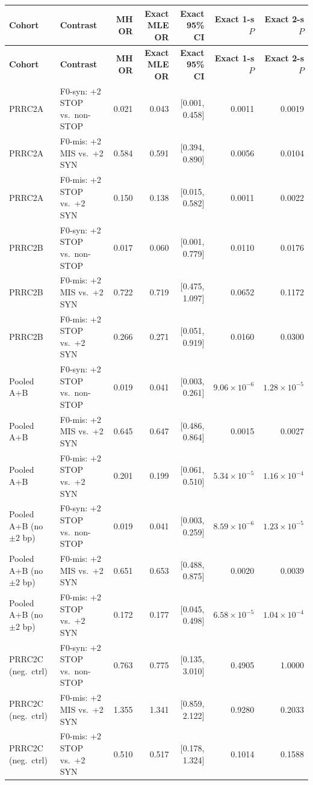 \documentclass[10pt,letterpaper]{article}
\begin{document}
\vspace{6pt}
\vspace{3pt}
{\scriptsize\setlength{\tabcolsep}{3.2pt}\renewcommand{\arraystretch}{1.08}
\begin{longtable}{@{}llrrrrr@{}}
\toprule
\textbf{Cohort} & \textbf{Contrast} & \textbf{MH OR} & \textbf{Exact MLE OR} & \textbf{Exact 95\% CI} & \textbf{Exact 1-s $P$} & \textbf{Exact 2-s $P$} \\
\midrule
\endfirsthead
\toprule
\textbf{Cohort} & \textbf{Contrast} & \textbf{MH OR} & \textbf{Exact MLE OR} & \textbf{Exact 95\% CI} & \textbf{Exact 1-s $P$} & \textbf{Exact 2-s $P$} \\
\midrule
\endhead
\bottomrule
\endfoot
PRRC2A & F0-syn: +2 STOP vs.\ non-STOP & 0.021 & 0.043 & [0.001, 0.458] & 0.0011 & 0.0019 \\
PRRC2A & F0-mis: +2 MIS vs.\ +2 SYN & 0.584 & 0.591 & [0.394, 0.890] & 0.0056 & 0.0104 \\
PRRC2A & F0-mis: +2 STOP vs.\ +2 SYN & 0.150 & 0.138 & [0.015, 0.582] & 0.0011 & 0.0022 \\
PRRC2B & F0-syn: +2 STOP vs.\ non-STOP & 0.017 & 0.060 & [0.001, 0.779] & 0.0110 & 0.0176 \\
PRRC2B & F0-mis: +2 MIS vs.\ +2 SYN & 0.722 & 0.719 & [0.475, 1.097] & 0.0652 & 0.1172 \\
PRRC2B & F0-mis: +2 STOP vs.\ +2 SYN & 0.266 & 0.271 & [0.051, 0.919] & 0.0160 & 0.0300 \\
Pooled A+B & F0-syn: +2 STOP vs.\ non-STOP & 0.019 & 0.041 & [0.003, 0.261] & $9.06 \times 10^{-6}$ & $1.28 \times 10^{-5}$ \\
Pooled A+B & F0-mis: +2 MIS vs.\ +2 SYN & 0.645 & 0.647 & [0.486, 0.864] & 0.0015 & 0.0027 \\
Pooled A+B & F0-mis: +2 STOP vs.\ +2 SYN & 0.201 & 0.199 & [0.061, 0.510] & $5.34 \times 10^{-5}$ & $1.16 \times 10^{-4}$ \\
Pooled A+B (no $\pm 2$ bp) & F0-syn: +2 STOP vs.\ non-STOP & 0.019 & 0.041 & [0.003, 0.259] & $8.59 \times 10^{-6}$ & $1.23 \times 10^{-5}$ \\
Pooled A+B (no $\pm 2$ bp) & F0-mis: +2 MIS vs.\ +2 SYN & 0.651 & 0.653 & [0.488, 0.875] & 0.0020 & 0.0039 \\
Pooled A+B (no $\pm 2$ bp) & F0-mis: +2 STOP vs.\ +2 SYN & 0.172 & 0.177 & [0.045, 0.498] & $6.58 \times 10^{-5}$ & $1.04 \times 10^{-4}$ \\
PRRC2C (neg.\ ctrl) & F0-syn: +2 STOP vs.\ non-STOP & 0.763 & 0.775 & [0.135, 3.010] & 0.4905 & 1.0000 \\
PRRC2C (neg.\ ctrl) & F0-mis: +2 MIS vs.\ +2 SYN & 1.355 & 1.341 & [0.859, 2.122] & 0.9280 & 0.2033 \\
PRRC2C (neg.\ ctrl) & F0-mis: +2 STOP vs.\ +2 SYN & 0.510 & 0.517 & [0.178, 1.324] & 0.1014 & 0.1588 \\
\end{longtable}
}
\end{document}
